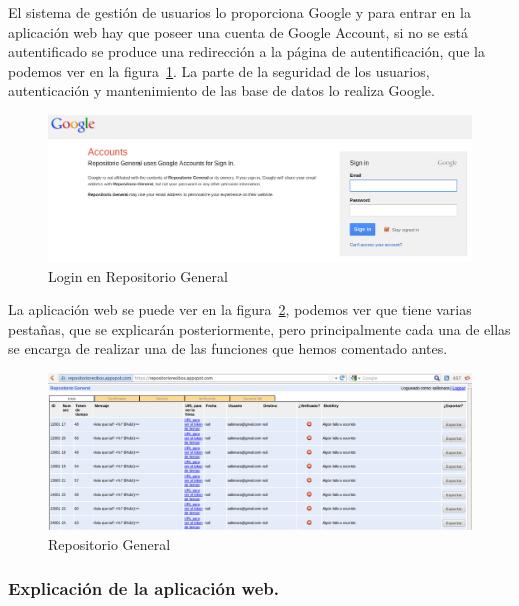 El sistema de gestión de usuarios lo proporciona Google y para entrar en la aplicación web hay que poseer una cuenta de Google Account, si no se está autentificado se produce una redirección a la página de autentificación, que la podemos ver en la figura~\ref{fig:logueoRepoGeneral}. La parte de la seguridad de los usuarios, autenticación y mantenimiento de las base de datos lo realiza Google.

\begin{figure}[h]
  \centering
    \includegraphics[scale=0.5]{./GoogleAppEngine/imagenes/login_repositorio_general.png}
  \caption{Login en Repositorio General}
  \label{fig:logueoRepoGeneral}
\end{figure}

La aplicación web se puede ver en la figura~\ref{fig:repositorio_general}, podemos ver que tiene varias pestañas, que se explicarán posteriormente, pero principalmente cada una de ellas se encarga de realizar una de las funciones que hemos comentado antes.

\begin{figure}[h]
  \centering
    \includegraphics[scale=0.4]{./GoogleAppEngine/imagenes/repositorio_general.png}
  \caption{Repositorio General}
  \label{fig:repositorio_general}
\end{figure}

\subsubsection{Explicación de la aplicación web.}

